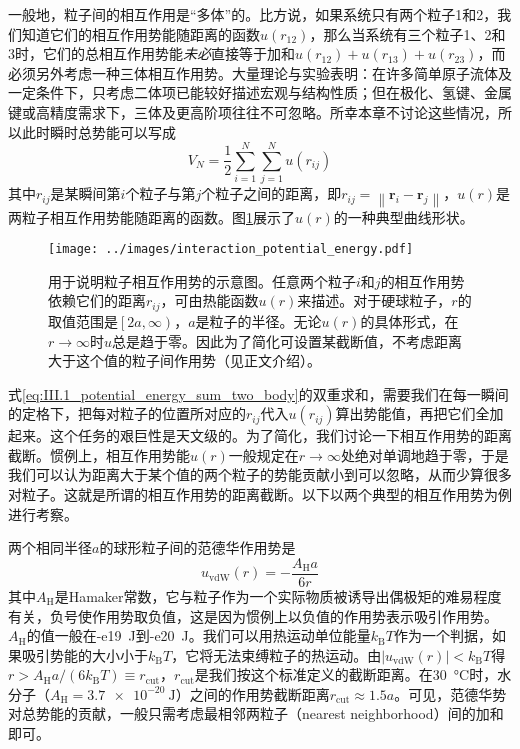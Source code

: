 \documentclass[main.tex]{subfiles}
\begin{document}
一般地，粒子间的相互作用是“多体”的。比方说，如果系统只有两个粒子1和2，我们知道它们的相互作用势能随距离的函数$u\left(r_{12}\right)$，那么当系统有三个粒子1、2和3时，它们的总相互作用势能\emph{未必}直接等于加和$u\left(r_{12}\right)+u\left(r_{13}\right)+u\left(r_{23}\right)$，而必须另外考虑一种三体相互作用势。大量理论与实验表明：在许多简单原子流体及一定条件下，只考虑二体项已能较好描述宏观与结构性质；但在极化、氢键、金属键或高精度需求下，三体及更高阶项往往不可忽略。所幸本章不讨论这些情况，所以此时瞬时总势能可以写成
\begin{equation}\label{eq:III.1_potential_energy_sum_two_body}
  V_N=\frac{1}{2}\sum_{i=1}^N\sum_{j=1}^N u\left(r_{ij}\right)
\end{equation}
其中$r_{ij}$是某瞬间第$i$个粒子与第$j$个粒子之间的距离，即$r_{ij}=\left\|\mathbf{r}_i-\mathbf{r}_j\right\|$，$u\left(r\right)$是两粒子相互作用势能随距离的函数。图\ref{fig:interaction_potential_energy}展示了$u\left(r\right)$的一种典型曲线形状。

\begin{figure}[ht]
  \centering
  \texttt{[image: ../images/interaction\_potential\_energy.pdf]}
  \caption{用于说明粒子相互作用势的示意图。任意两个粒子$i$和$j$的相互作用势依赖它们的距离$r_{ij}$，可由热能函数$u\left(r\right)$来描述。对于硬球粒子，$r$的取值范围是$\left[2a,\infty\right)$，$a$是粒子的半径。无论$u\left(r\right)$的具体形式，在$r\rightarrow \infty$时$u$总是趋于零。因此为了简化可设置某截断值，不考虑距离大于这个值的粒子间作用势（见正文介绍）。}
  \label{fig:interaction_potential_energy}
\end{figure}

式\eqref{eq:III.1_potential_energy_sum_two_body}的双重求和，需要我们在每一瞬间的定格下，把每对粒子的位置所对应的$r_{ij}$代入$u\left(r_{ij}\right)$算出势能值，再把它们全加起来。这个任务的艰巨性是天文级的。为了简化，我们讨论一下相互作用势的距离截断。惯例上，相互作用势能$u\left(r\right)$一般规定在$r\rightarrow\infty$处绝对单调地趋于零，于是我们可以认为距离大于某个值的两个粒子的势能贡献小到可以忽略，从而少算很多对粒子。这就是所谓的相互作用势的距离截断。以下以两个典型的相互作用势为例进行考察。

两个相同半径$a$的球形粒子间的范德华作用势是
\[u_\text{vdW}\left(r\right)=-\frac{A_\text{H}a}{6r}\]
其中$A_\text{H}$是Hamaker常数，它与粒子作为一个实际物质被诱导出偶极矩的难易程度有关，负号使作用势取负值，这是因为惯例上以负值的作用势表示吸引作用势。$A_\text{H}$的值一般在\qty{-e19}{\joule}到\qty{-e20}{\joule}。我们可以用热运动单位能量$k_\text{B}T$作为一个判据，如果吸引势能的大小小于$k_\text{B}T$，它将无法束缚粒子的热运动。由$\left|u_\text{vdW}\left(r\right)\right|<k_\text{B}T$得$r>A_\text{H}a/\left(6k_\text{B}T\right)\equiv r_\text{cut}$，$r_\text{cut}$是我们按这个标准定义的截断距离。在\qty{30}{\degreeCelsius}时，水分子（$A_\text{H}=\qty{3.7e-20}{\joule}$）之间的作用势截断距离$r_\text{cut}\approx 1.5a$。可见，范德华势对总势能的贡献，一般只需考虑最相邻两粒子（nearest neighborhood）间的加和即可。
\end{document}
